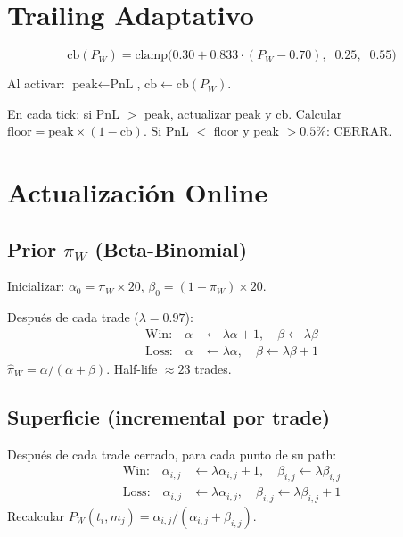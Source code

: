 \documentclass[11pt,a4paper]{article}
\newcommand{\pw}{P_W}
\begin{document}
\section{Trailing Adaptativo}

\begin{tcolorbox}[formula, title=Callback como funci\'on de $\pw$]
\begin{equation}
\boxed{\text{cb}(\pw) = \text{clamp}\bigl(0.30 + 0.833 \cdot (\pw - 0.70),\;\; 0.25,\;\; 0.55\bigr)}
\end{equation}

Al activar: $\text{peak} \leftarrow \text{PnL}$, $\text{cb} \leftarrow \text{cb}(\pw)$.

En cada tick: si PnL $>$ peak, actualizar peak y cb. Calcular $\text{floor} = \text{peak} \times (1 - \text{cb})$. Si PnL $<$ floor y peak $> 0.5\%$: CERRAR.
\end{tcolorbox}

\section{Actualizaci\'on Online}

\subsection{Prior $\pi_W$ (Beta-Binomial)}

\begin{tcolorbox}[formula, title=Filtro Beta-Binomial con decay]
Inicializar: $\alpha_0 = \pi_W \times 20$, $\beta_0 = (1-\pi_W) \times 20$.

Despu\'es de cada trade ($\lambda = 0.97$):
\begin{align}
\text{Win:}\quad \alpha &\leftarrow \lambda\alpha + 1, \quad \beta \leftarrow \lambda\beta \\
\text{Loss:}\quad \alpha &\leftarrow \lambda\alpha, \quad \beta \leftarrow \lambda\beta + 1
\end{align}
$\hat{\pi}_W = \alpha / (\alpha + \beta)$. Half-life $\approx 23$ trades.
\end{tcolorbox}

\subsection{Superficie (incremental por trade)}

Despu\'es de cada trade cerrado, para cada punto de su path:
\begin{align}
\text{Win:}\quad \alpha_{i,j} &\leftarrow \lambda\alpha_{i,j} + 1, \quad \beta_{i,j} \leftarrow \lambda\beta_{i,j} \\
\text{Loss:}\quad \alpha_{i,j} &\leftarrow \lambda\alpha_{i,j}, \quad \beta_{i,j} \leftarrow \lambda\beta_{i,j} + 1
\end{align}
Recalcular $\pw(t_i, m_j) = \alpha_{i,j} / (\alpha_{i,j} + \beta_{i,j})$.
\end{document}
